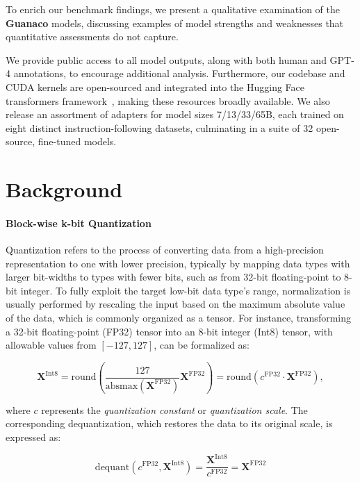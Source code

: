 To enrich our benchmark findings, we present a qualitative examination of the \textbf{Guanaco} models, discussing examples of model strengths and weaknesses that quantitative assessments do not capture.

We provide public access to all model outputs, along with both human and GPT-4 annotations, to encourage additional analysis. Furthermore, our codebase and CUDA kernels are open-sourced and integrated into the Hugging Face transformers framework~\citep{wolf2019huggingface}, making these resources broadly available. We also release an assortment of adapters for model sizes 7/13/33/65B, each trained on eight distinct instruction-following datasets, culminating in a suite of 32 open-source, fine-tuned models.

\section{Background}
\paragraph{Block-wise k-bit Quantization} Quantization refers to the process of converting data from a high-precision representation to one with lower precision, typically by mapping data types with larger bit-widths to types with fewer bits, such as from 32-bit floating-point to 8-bit integer. To fully exploit the target low-bit data type's range, normalization is usually performed by rescaling the input based on the maximum absolute value of the data, which is commonly organized as a tensor. For instance, transforming a 32-bit floating-point (FP32) tensor into an 8-bit integer (Int8) tensor, with allowable values from $[-127, 127]$, can be formalized as:

\begin{equation}
    \mathbf{X}^{ \text{Int8}} = \text{round}\left( \frac{127}{{\text{absmax}}(\mathbf{X}^{{\text{FP32}}})}\mathbf{X}^{{\text{FP32}}} \right) = \text{round}(c^{\text{FP32}}\cdot \mathbf{X}^{{\text{FP32}}}),
\end{equation}

where $c$ represents the {\em quantization constant} or {\em quantization scale}. The corresponding dequantization, which restores the data to its original scale, is expressed as:

\begin{equation}
    \text{dequant}(c^{\text{FP32}}, \mathbf{X}^{\text{Int8}}) = \frac{\mathbf{X}^{\text{Int8}}}{c^{\text{FP32}}} = \mathbf{X}^{\text{FP32}}
\end{equation}

